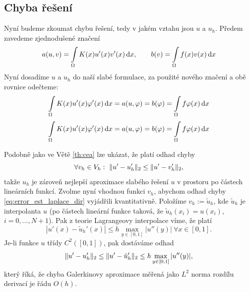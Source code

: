 \subsection{Chyba řešení}

Nyní budeme zkoumat chybu řešení, tedy v jakém vztahu jsou $u$ a $u_h$.
Předem zavedeme zjednodušené značení
\[
a(u,v) = \int\limits_\Omega K(x) u'(x) v'(x) \,{\rm d} x, \qquad b(v) = \int\limits_\Omega f(x) v(x) \,{\rm d} x
\]
Nyní dosadíme $u$ a $u_h$ do naší slabé formulace, za použité nového značení a obě rovnice odečteme:
\[
\int\limits_\Omega K(x) u'(x) \varphi'(x) \,{\rm d} x = a(u,\varphi) = b(\varphi) = \int\limits_\Omega f \varphi(x) \,{\rm d} x
\]
\[
\int\limits_\Omega K(x) u'(x) \varphi'(x) \,{\rm d} x = a(u,\varphi) = b(\varphi) = \int\limits_\Omega f \varphi(x) \,{\rm d} x
\]



Podobně jako ve Větě \ref{th:cea} lze ukázat, že platí odhad chyby
\begin{equation}\label{eq:error_est_laplace_dir}
\forall v_h\in V_h:~\|u'-u_h'\|_2 \le \|u'-v_h'\|_2,
\end{equation}
takže $u_h$ je zároveň nejlepší aproximace slabého řešení $u$ v prostoru po částech lineárních funkcí.
Zvolme nyní vhodnou funkci $v_h$, abychom odhad chyby \eqref{eq:error_est_laplace_dir} vyjádřili kvantitativně.
Položíme $v_h:=\tilde u_h$, kde $\tilde u_h$ je interpolanta $u$ (po částech lineární funkce taková, že $\tilde u_h(x_i)=u(x_i)$, $i=0,...,N+1$).
Pak z teorie Lagrangeovy interpolace víme, že platí
\[ |u'(x)-\tilde u_h'(x)|\le h\max_{y\in[0,1]}|u''(y)| ~\forall x\in[0,1]. \]
Je-li funkce $u$ třídy $C^2([0,1])$, pak dostáváme odhad
\[ \|u'-u_h'\|_2 \le \|u'-\tilde u_h'\|_2 \le h\max_{y\in[0,1]}|u''(y)|, \]
který říká, že chyba Galerkinovy aproximace měřená jako $L^2$ norma rozdílu derivací je řádu $O(h)$.







